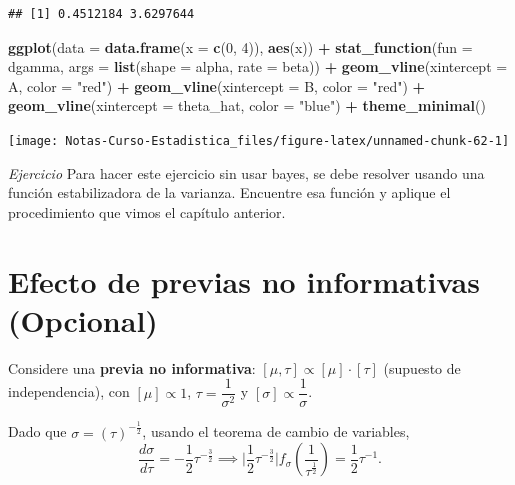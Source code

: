 \documentclass[
  12pt,
]{book}
\newenvironment{Shaded}{\begin{snugshade}}{\end{snugshade}}
\newcommand{\DataTypeTok}[1]{\textcolor[rgb]{0.13,0.29,0.53}{#1}}
\newcommand{\DecValTok}[1]{\textcolor[rgb]{0.00,0.00,0.81}{#1}}
\newcommand{\KeywordTok}[1]{\textcolor[rgb]{0.13,0.29,0.53}{\textbf{#1}}}
\newcommand{\NormalTok}[1]{#1}
\newcommand{\OperatorTok}[1]{\textcolor[rgb]{0.81,0.36,0.00}{\textbf{#1}}}
\newcommand{\StringTok}[1]{\textcolor[rgb]{0.31,0.60,0.02}{#1}}
\begin{document}
\begin{verbatim}
## [1] 0.4512184 3.6297644
\end{verbatim}

\begin{Shaded}
\begin{Highlighting}[]
\KeywordTok{ggplot}\NormalTok{(}\DataTypeTok{data =} \KeywordTok{data.frame}\NormalTok{(}\DataTypeTok{x =} \KeywordTok{c}\NormalTok{(}\DecValTok{0}\NormalTok{, }\DecValTok{4}\NormalTok{)), }\KeywordTok{aes}\NormalTok{(x)) }\OperatorTok{+}
\StringTok{  }\KeywordTok{stat\_function}\NormalTok{(}\DataTypeTok{fun =}\NormalTok{ dgamma, }\DataTypeTok{args =} \KeywordTok{list}\NormalTok{(}\DataTypeTok{shape =}\NormalTok{ alpha, }\DataTypeTok{rate =}\NormalTok{ beta)) }\OperatorTok{+}
\StringTok{  }\KeywordTok{geom\_vline}\NormalTok{(}\DataTypeTok{xintercept =}\NormalTok{ A, }\DataTypeTok{color =} \StringTok{"red"}\NormalTok{) }\OperatorTok{+}
\StringTok{  }\KeywordTok{geom\_vline}\NormalTok{(}\DataTypeTok{xintercept =}\NormalTok{ B, }\DataTypeTok{color =} \StringTok{"red"}\NormalTok{) }\OperatorTok{+}
\StringTok{  }\KeywordTok{geom\_vline}\NormalTok{(}\DataTypeTok{xintercept =}\NormalTok{ theta\_hat, }\DataTypeTok{color =} \StringTok{"blue"}\NormalTok{) }\OperatorTok{+}
\StringTok{  }\KeywordTok{theme\_minimal}\NormalTok{()}
\end{Highlighting}
\end{Shaded}

\begin{center}\texttt{[image: Notas-Curso-Estadistica\_files/figure-latex/unnamed-chunk-62-1]} \end{center}

\emph{Ejercicio} Para hacer este ejercicio sin usar bayes, se debe resolver usando
una función estabilizadora de la varianza. Encuentre esa función y aplique el
procedimiento que vimos el capítulo anterior.

\hypertarget{efecto-de-previas-no-informativas-opcional}{%
\section{Efecto de previas no informativas (Opcional)}\label{efecto-de-previas-no-informativas-opcional}}

Considere una \textbf{previa no informativa}: \([\mu,\tau] \propto [\mu]\cdot[\tau]\) (supuesto de
independencia), con \([\mu] \propto 1\), \(\tau = \dfrac1{\sigma^2}\) y \([\sigma] \propto \dfrac{1}{\sigma}\).

Dado que \(\sigma = (\tau)^{-\frac{1}2}\), usando el teorema de cambio de variables,
\[\dfrac{d\sigma}{d\tau} = -\dfrac12\tau^{-\frac32} \implies
\bigg|\dfrac12\tau^{-\frac32}\bigg|f_\sigma\left(\dfrac 1{\tau^{\frac12}}\right) = \dfrac
12 \tau^{-1}.\]
\end{document}
